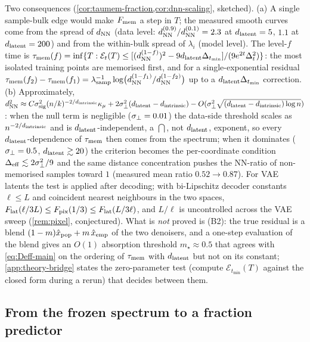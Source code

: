 Two consequences (\cref{cor:taumem-fraction,cor:dnn-scaling}, sketched). (a) A single sample-bulk edge would make $F_{\rm mem}$ a step in $T$; the measured smooth curves come from the spread of $d_{\rm NN}$ (data level: $d^{(0.9)}_{\rm NN}/d^{(0.1)}_{\rm NN}=2.3$ at $d_{\mathrm{latent}}=5$, $1.1$ at $d_{\mathrm{latent}}=200$) and from the within-bulk spread of $\lambda_i$ (model level). The level-$f$ time is $\tau_{\mathrm{mem}}(f)=\inf\{T:\mathcal E_t(T)\le[(d^{(1-f)}_{\rm NN})^2-9d_{\mathrm{latent}}\Delta_{t_{\min}}]/(9e^{2t}\Delta_t^2)\}$: the most isolated training points are memorised first, and for a single-exponential residual $\tau_{\mathrm{mem}}(f_2)-\tau_{\mathrm{mem}}(f_1)=\lambda_{\rm samp}^{-1}\log\bigl(d^{(1-f_1)}_{\rm NN}/d^{(1-f_2)}_{\rm NN}\bigr)$ up to a $d_{\mathrm{latent}}\Delta_{t_{\min}}$ correction. (b) Approximately, $d_{\rm NN}^2\approx C\sigma_{\mathrm{sig}}^2(n/k)^{-2/d_{\mathrm{intrinsic}}}\kappa_\mu+2\sigma_{\perp}^2(d_{\mathrm{latent}}-d_{\mathrm{intrinsic}})-O(\sigma_{\perp}^2\sqrt{(d_{\mathrm{latent}}-d_{\mathrm{intrinsic}})\log n})$: when the null term is negligible ($\sigma_{\perp}=0.01$) the data-side threshold scales as $n^{-2/d_{\mathrm{intrinsic}}}$ and is $d_{\mathrm{latent}}$-independent, a $\dint$, not $d_{\mathrm{latent}}$, exponent, so every $d_{\mathrm{latent}}$-dependence of $\tau_{\mathrm{mem}}$ then comes from the spectrum; when it dominates ($\sigma_{\perp}=0.5$, $d_{\mathrm{latent}}\gtrsim20$) the criterion becomes the per-coordinate condition $\Delta_{\rm eff}\lesssim2\sigma_{\perp}^2/9$ and the same distance concentration pushes the NN-ratio of non-memorised samples toward $1$ (measured mean ratio $0.52\to0.87$). For VAE latents the test is applied after decoding; with bi-Lipschitz decoder constants $\ell\le L$ and coincident nearest neighbours in the two spaces, $F_{\rm lat}(\ell/3L)\le F_{\rm pix}(1/3)\le F_{\rm lat}(L/3\ell)$, and $L/\ell$ is uncontrolled across the VAE sweep (\cref{rem:pixel}, conjectured). What is \emph{not} proved is (B2): the true residual is a blend $(1-m)\hat x_{\rm pop}+m\,\hat x_{\rm emp}$ of the two denoisers, and a one-step evaluation of the blend gives an $O(1)$ absorption threshold $m_\star\approx0.5$ that agrees with \eqref{eq:Deff-main} on the ordering of $\tau_{\mathrm{mem}}$ with $d_{\mathrm{latent}}$ but not on its constant; \cref{app:theory-bridge} states the zero-parameter test (compute $\mathcal E_{t_{\min}}(T)$ against the closed form during a rerun) that decides between them.

\subsection{From the frozen spectrum to a fraction predictor}
\label{sec:theory-predictor}

